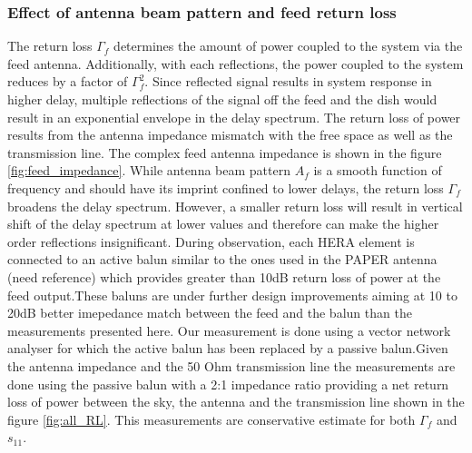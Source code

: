 \documentclass[twocolumn]{emulateapj}
\begin{document}
\subsubsection{\textbf{Effect of antenna beam pattern and feed return loss}}
The return loss $\Gamma_{f}$ determines the amount of power coupled to the system via the feed antenna. Additionally, with each reflections, the power coupled to the system reduces by a factor of $\Gamma_{f}^{2}$. Since reflected signal results in system response in higher delay, multiple reflections of the signal off the feed and the dish would result in an exponential envelope in the delay spectrum.  The return loss of power results from the antenna impedance mismatch with the free space as well as the transmission line. The complex feed antenna impedance is shown in the figure \ref{fig:feed_impedance}.
While antenna beam pattern $A_{f}$ is a smooth function of frequency and should have its imprint confined to lower delays, the return loss $\Gamma_{f}$ broadens the delay spectrum. However, a smaller return loss will result in vertical shift of the delay spectrum at lower values and therefore can make the higher order reflections insignificant. During observation, each HERA element is connected to an active balun similar to the ones used in the PAPER antenna (need reference) which provides greater than 10dB return loss of power at the feed output.These baluns are under further design improvements aiming at 10 to 20dB better imepedance match between the feed and the balun than the measurements presented here.  Our measurement is done using a vector network analyser for which the active balun has been replaced by a passive balun.Given the antenna impedance and the 50 Ohm transmission line the measurements are done using the passive balun with a 2:1 impedance ratio providing a net return loss of power between the sky, the antenna and the transmission line shown in the figure \ref{fig:all_RL}. This measurements are conservative estimate  for both $\Gamma_{f}$ and $s_{11}$.
\end{document}
